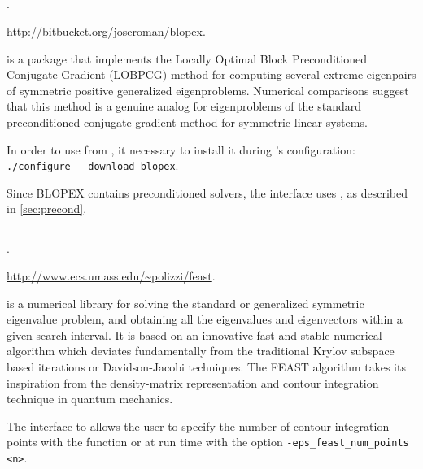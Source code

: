 \subsection*{\underline{\blopex}}
	\begin{description}
	\setlength{\itemsep}{0pt}
	\item[References.]\citep{Knyazev:2007:BLO}.
	\item[Website.] \url{http://bitbucket.org/joseroman/blopex}.
	\item[Summary.] \blopex is a package that implements the Locally Optimal Block Preconditioned Conjugate Gradient (LOBPCG) method for computing several extreme eigenpairs of symmetric positive generalized eigenproblems. Numerical comparisons suggest that this method is a genuine analog for eigenproblems of the standard preconditioned conjugate gradient method for symmetric linear systems.
	\item[Installation.] In order to use \blopex from \slepc, it necessary to install it during \slepc's configuration: \Verb!./configure --download-blopex!.
	\item[Specific options.] Since BLOPEX contains preconditioned solvers, the \slepc interface uses , as described in \ref{sec:precond}.
	\end{description}

\subsection*{\underline{\feast}}
	\begin{description}
	\setlength{\itemsep}{0pt}
	\item[References.]\citep{Polizzi:2009:DAS}.
	\item[Website.] \url{http://www.ecs.umass.edu/~polizzi/feast}.
	\item[Summary.] \feast is a numerical library for solving the standard or generalized symmetric eigenvalue problem, and obtaining all the eigenvalues and eigenvectors within a given search interval. It is based on an innovative fast and stable numerical algorithm which deviates fundamentally from the traditional Krylov subspace based iterations or Davidson-Jacobi techniques. The FEAST algorithm takes its inspiration from the density-matrix representation and contour integration technique in quantum mechanics.
	\item[Specific options.] The \slepc interface to \feast allows the user to specify the number of contour integration points with the function  or at run time with the option \Verb!-eps_feast_num_points <n>!.
	\end{description}


